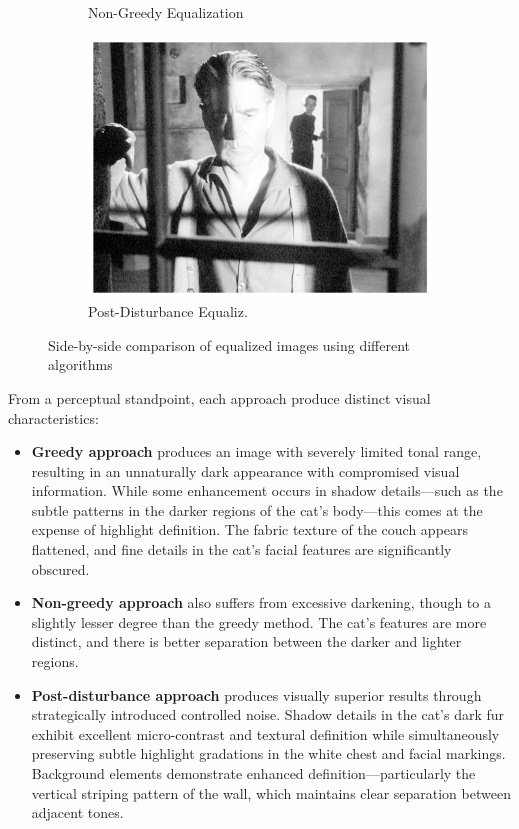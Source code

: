 \documentclass[12pt,a4paper]{article}
\begin{document}
\begin{figure}[H]
\begin{subfigure}{0.32\textwidth}
        \caption{Non-Greedy Equalization}
    \end{subfigure}
    \hfill
    \begin{subfigure}{0.32\textwidth}
        \includegraphics[width=\textwidth]{results/images/equalized_post-disturbance.png}
        \caption{Post-Disturbance Equaliz.}
    \end{subfigure}
    \caption{Side-by-side comparison of equalized images using different algorithms}
    \label{fig:eq_images}
\end{figure}


From a perceptual standpoint, each approach produce distinct visual characteristics:

\begin{itemize}
    \item \textbf{Greedy approach} produces an image with severely limited tonal range, resulting in an unnaturally dark appearance with compromised visual information. While some enhancement occurs in shadow details—such as the subtle patterns in the darker regions of the cat's body—this comes at the expense of highlight definition. The fabric texture of the couch appears flattened, and fine details in the cat's facial features are significantly obscured.
    
    \item \textbf{Non-greedy approach} also suffers from excessive darkening, though to a slightly lesser degree than the greedy method. The cat's features are more distinct, and there is better separation between the darker and lighter regions.
    
    \item \textbf{Post-disturbance approach} produces visually superior results through strategically introduced controlled noise. Shadow details in the cat's dark fur exhibit excellent micro-contrast and textural definition while simultaneously preserving subtle highlight gradations in the white chest and facial markings. Background elements demonstrate enhanced definition—particularly the vertical striping pattern of the wall, which maintains clear separation between adjacent tones. 
\end{itemize}
\end{document}
